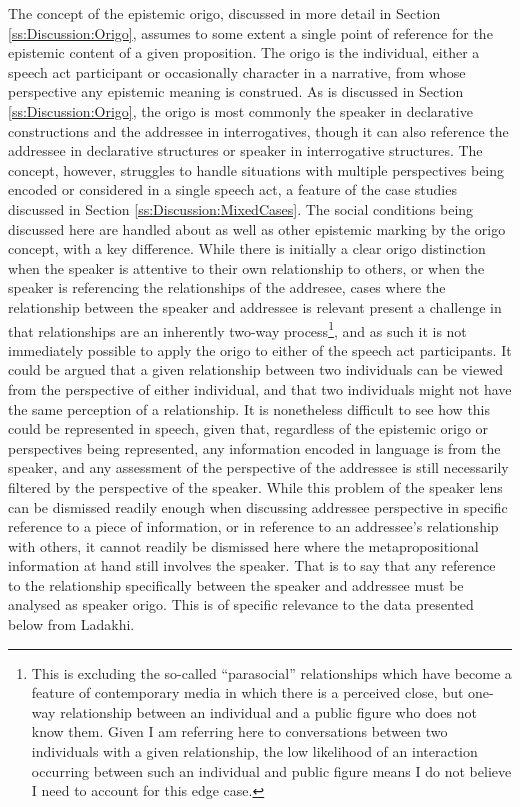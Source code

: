 The concept of the epistemic origo, discussed in more detail in Section \ref{ss:Discussion:Origo}, assumes to some extent a single point of reference for the epistemic content of a given proposition. The origo is the individual, either a speech act participant or occasionally character in a narrative, from whose perspective any epistemic meaning is construed. As is discussed in Section \ref{ss:Discussion:Origo}, the origo is most commonly the speaker in declarative constructions and the addressee in interrogatives, though it can also reference the addressee in declarative structures or speaker in interrogative structures. The concept, however, struggles to handle situations with multiple perspectives being encoded or considered in a single speech act, a feature of the case studies discussed in Section \ref{ss:Discussion:MixedCases}. The social conditions being discussed here are handled about as well as other epistemic marking by the origo concept, with a key difference. While there is initially a clear origo distinction when the speaker is attentive to their own relationship to others, or when the speaker is referencing the relationships of the addresee, cases where the relationship between the speaker and addressee is relevant present a challenge in that relationships are an inherently two-way process\footnote{This is excluding the so-called ``parasocial'' relationships which have become a feature of contemporary media in which there is a perceived close, but one-way relationship between an individual and a public figure who does not know them. Given I am referring here to conversations between two individuals with a given relationship, the low likelihood of an interaction occurring between such an individual and public figure means I do not believe I need to account for this edge case.}, and as such it is not immediately possible to apply the origo to either of the speech act participants. It could be argued that a given relationship between two individuals can be viewed from the perspective of either individual, and that two individuals might not have the same perception of a relationship. It is nonetheless difficult to see how this could be represented in speech, given that, regardless of the epistemic origo or perspectives being represented, any information encoded in language is from the speaker, and any assessment of the perspective of the addressee is still necessarily filtered by the perspective of the speaker. While this problem of the speaker lens can be dismissed readily enough when discussing addressee perspective in specific reference to a piece of information, or in reference to an addressee's relationship with others, it cannot readily be dismissed here where the metapropositional information at hand still involves the speaker. That is to say that any reference to the relationship specifically between the speaker and addressee must be analysed as speaker origo. This is of specific relevance to the data presented below from Ladakhi. 

